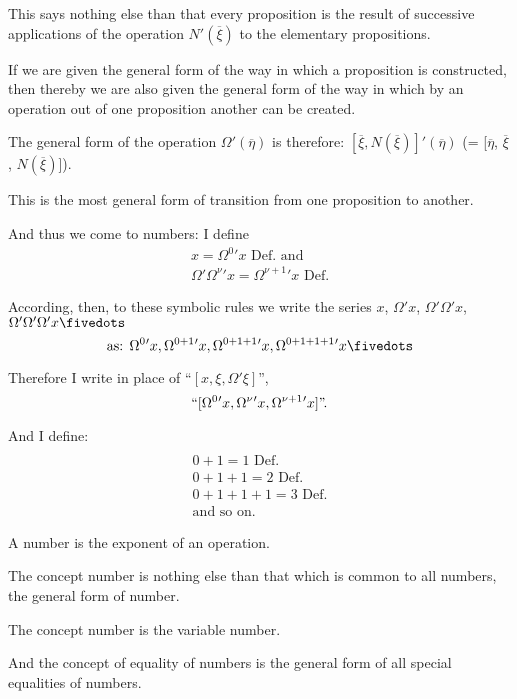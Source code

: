 {This says nothing else than that every proposition
is the result of successive applications
of the operation $N'(\overline{\xi})$ to the elementary propositions.}


{If we are given the general form of the way in
which a proposition is constructed, then thereby
we are also given the general form of the way in
which by an operation out of one proposition
another can be created.}


{The general form of the operation $\Omega'(\overline{\eta})$ is
therefore: $[\overline{\xi}, N(\overline{\xi})]'${}$(\overline{\eta})$ (= [$\overline{\eta}$, $\overline{\xi}$, $N(\overline{\xi})$]).

This is the most general form of transition from
one proposition to another.}


{And thus we come to numbers: I define}
\begin{gather*}
x = \Omega^{0}{}' x \text{ Def.\ and}\\
\Omega'\Omega^{\nu}{}'x = \Omega^{\nu+1}{}'x \text{ Def.}
\end{gather*}

According, then, to these symbolic rules we
write the series $x$, $\Omega'x$, $\Omega'\Omega'x$, $\Omega'\Omega'\Omega'x\fivedots$
\[
\text{as: } \Omega^{0}{}'x, \Omega^{0+1}{}'x, \Omega^{0+1+1}{}'x, \Omega^{0+1+1+1}{}'x\fivedots
\]

Therefore I write in place of ``$[x, \xi, \Omega'\xi]$'',
\[
``[\Omega^{0}{}'x, \Omega^{\nu}{}'x, \Omega^{\nu+1}{}'x]\text{''.}
\]

And I define:
\[
\begin{array}{l}\\
0 + 1 = 1\text{ Def.}\\
0 + 1 + 1 = 2\text{ Def.}\\
0 + 1 + 1 + 1 = 3\text{ Def.}\\
\text{and so on.}
\end{array}
\]

{A number is the exponent of an operation.}


{The concept number is nothing else than that
which is common to all numbers, the general form
of number.

The concept number is the variable number.

And the concept of equality of numbers is the
general form of all special equalities of numbers.}


